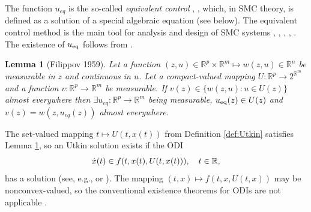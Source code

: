 \documentclass{article}
\newcommand{\R}{\mathbb{R}}
\newtheorem{lemma}{Lemma}
\begin{document}
The function $u_{eq}$ is the so-called \textit{equivalent control} \cite{Utkin1992:Book}, \cite{Filippov1988:Book}, which,
in SMC theory, is defined as a solution of a special algebraic equation (see below). 
The equivalent control method is the main tool for analysis and design of SMC systems \cite{Utkin1992:Book}, \cite{EdwardsSpurgeon1998:Book}, \cite{Shtessel_etal2014:Book}, \cite{Utkin_etal2020:Book}, \cite{Orlov2020:Book}.
The existence of $u_{\rm eq}$  follows from  \cite{Filippov1962:SIAM}.
\begin{lemma}[\small Filippov 1959]\label{lem:Filippov_selector}\itshape
	Let a function $(z,u)\in \R^p \times \R^m \mapsto w(z,u)\in \R^n$ be measurable in $z$ and continuous in $u$. Let a {compact}-valued mapping  $U :\R^{p} \to 2^{\R^m}$  
	and a function $v:\R^p\to \R^m$ be measurable. If $v(z)\in \{w(z,u): u\in U(z)\}$ almost everywhere 
	then $\exists u_{eq}:\R^p\to \R^m$ being measurable, $u_{\rm eq}(z)\in U(z)$   and  $v(z)=w(z,u_{eq}(z))$ almost everywhere. 
\end{lemma}
The set-valued mapping $t\mapsto U(t, x(t))$  from Definition \ref{def:Utkin} satisfies Lemma \ref{lem:Filippov_selector}, so an Utkin solution exists if the  ODI\vspace{-1mm}
\begin{equation}\label{eq:Ueq_DI}
	\dot x(t)\in f(t,x(t),U(t,x(t))), \quad t\in\R,\vspace{-1mm}
\end{equation}
has a solution (see, e.g., \cite{Filippov1988:Book} or \cite{PolyakovFridman2014:JFI}).
The mapping $(t,x)\mapsto  f(t,x,U(t,x))$ may be nonconvex-valued, so the conventional existence theorems for ODIs  \cite{Filippov1988:Book} are not applicable  \cite{BartoliniZolezzi1985:IEEE_TAC}. 
\end{document}
